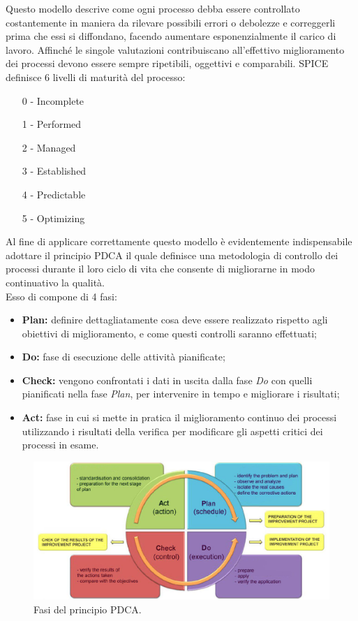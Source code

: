 \documentclass[a4paper]{article}
\begin{document}
				Questo modello descrive come ogni processo debba essere controllato costantemente in maniera da 
				rilevare possibili errori o debolezze e correggerli prima che essi si diffondano, facendo 
				aumentare esponenzialmente il carico di lavoro. Affinché le singole valutazioni contribuiscano 
				all'effettivo miglioramento dei processi devono essere sempre ripetibili, oggettivi e comparabili.
				SPICE definisce 6 livelli di maturità del processo:
				\begin{itemize}
					\item[0] - Incomplete
					\item[1] - Performed
					\item[2] - Managed
					\item[3] - Established
					\item[4] - Predictable
					\item[5] - Optimizing					
				\end{itemize}
				Al fine di applicare correttamente questo modello è evidentemente indispensabile adottare il 
				principio PDCA il quale definisce una metodologia di controllo dei processi durante il loro 
				ciclo di vita che consente di migliorarne in modo continuativo la qualità. \\ 
				Esso di compone di 4 fasi:
				\begin{itemize}
					\item \textbf{Plan:} definire dettagliatamente cosa deve essere realizzato rispetto agli 
					obiettivi di miglioramento, e come questi controlli saranno effettuati;
					\item \textbf{Do:} fase di esecuzione delle attività pianificate;
					\item \textbf{Check:} vengono confrontati i dati in uscita dalla fase \emph{Do} con quelli 
					pianificati nella fase \emph{Plan}, per intervenire in tempo e migliorare i risultati;
					\item \textbf{Act:} fase in cui si mette in pratica il miglioramento continuo dei processi
					 utilizzando i risultati della verifica per modificare gli aspetti critici dei processi in esame.
				\end{itemize}
				\begin{figure}[H]
					\centering
					\includegraphics[scale=0.4]{PDCA.jpg}
					\caption{Fasi del principio PDCA.}
				\end{figure}
\end{document}
